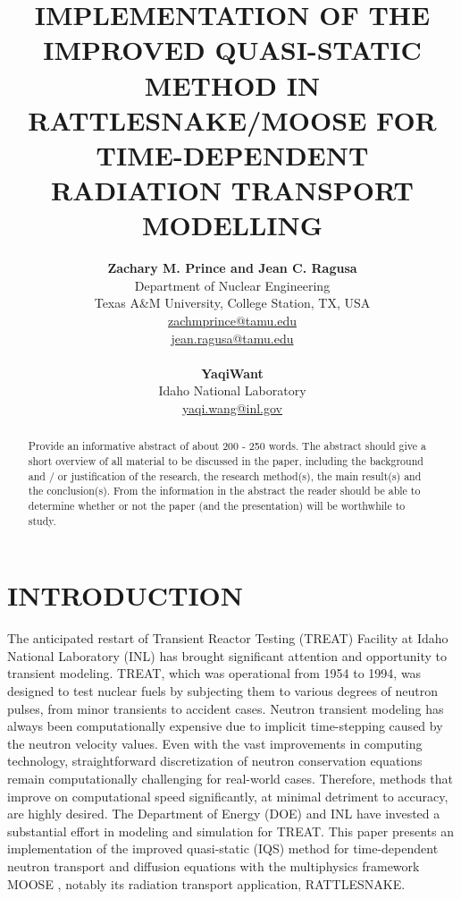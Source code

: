 \documentclass[12pt]{article}
\title{IMPLEMENTATION OF THE IMPROVED QUASI-STATIC METHOD IN RATTLESNAKE/MOOSE FOR TIME-DEPENDENT RADIATION TRANSPORT MODELLING}
\author{ 
  \textbf{Zachary M. Prince and Jean C. Ragusa} \\
  Department of Nuclear Engineering \\
  Texas A\&M University, College Station, TX, USA\\
  \href{mailto:zachmprince@tamu.edu}{zachmprince@tamu.edu}\\
  \href{mailto:jean.ragusa@tamu.edu}{jean.ragusa@tamu.edu}\\
  \\                       %
  \textbf{YaqiWant} \\
   Idaho National Laboratory \\
  \href{mailto:yaqi.wang@inl.gov}{yaqi.wang@inl.gov} 
}
\begin{document}


\maketitle

\begin{abstract}
  Provide an informative abstract of about 200 - 250 words. The abstract should give a short overview of all material to be discussed in the paper, including the background and / or justification of the research, the research method(s), the main result(s) and the conclusion(s). From the information in the abstract the reader should be able to determine whether or not the paper (and the presentation) will be worthwhile to study.
\end{abstract}


%
\section{INTRODUCTION}
\label{sect::intro}

The anticipated restart of Transient Reactor Testing (TREAT) Facility at Idaho National Laboratory (INL) has brought significant attention and opportunity to transient modeling.  TREAT, which was operational from 1954 to 1994, was designed to test nuclear fuels by subjecting them to various degrees of neutron pulses, from minor transients to accident cases.  Neutron transient modeling has always been computationally expensive due to implicit time-stepping caused by the neutron velocity values. Even with the vast improvements in computing technology, straightforward discretization of neutron conservation equations remain computationally challenging for real-world cases.  Therefore, methods that improve on computational speed significantly, at minimal detriment to accuracy, are highly desired. The Department of Energy (DOE) and INL have invested a substantial effort in modeling and simulation for TREAT.  This paper presents an implementation of the improved quasi-static (IQS) method for time-dependent neutron transport and diffusion equations with the multiphysics framework MOOSE \cite{moose}, notably its radiation transport application, RATTLESNAKE.
\end{document}
